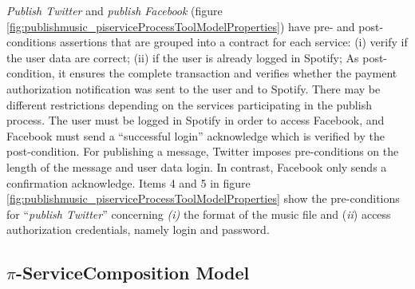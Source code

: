 \textit{Publish Twitter} and \textit{publish Facebook} (figure
\ref{fig:publishmusic_piserviceProcessToolModelProperties}) have pre- and
post-conditions assertions that are grouped into a contract for each service:
(i) verify if the user data are correct; (ii) if the user is already logged in
Spotify; As post-condition, it ensures the complete transaction and
verifies whether the payment authorization notification was sent to the user and to Spotify.
There may be different restrictions depending on the services participating in
the publish process. The user must be logged in Spotify in order to access
Facebook, and Facebook must send a ``successful login'' acknowledge which is
verified by the post-condition. For publishing a message, Twitter imposes
pre-conditions on the length of the message and user data login. In contrast,
Facebook only sends a confirmation acknowledge. Items 4 and 5 in figure
\ref{fig:publishmusic_piserviceProcessToolModelProperties} show the
pre-conditions for ``\textit{publish Twitter}'' concerning \textit{(i)} the format
of the music file and (\textit{ii}) access authorization credentials, namely
login and password.







 \subsection{$\pi$-ServiceComposition Model}
\label{sec:serviceComposition_topublishMusic}

